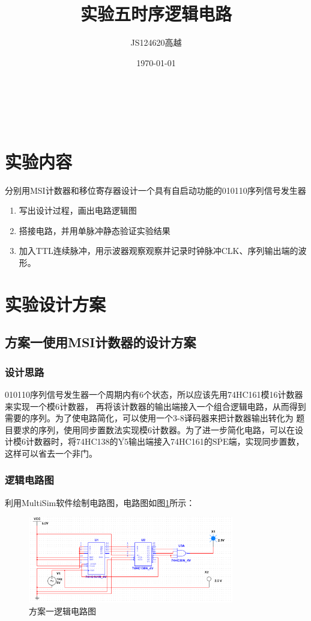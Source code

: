 \documentclass[zihao=-4]{ctexart} %
\title{实验五\quad 时序逻辑电路}
\author{JS124620\quad 高越}
\date{\today} %
\makeatletter
\renewcommand{\maketitle}{
    \begin{center}
        {\zihao{2}\CJKfontspec[FakeBold=3]{SimSun} \@title} \\[0.75em] %
        {\zihao{-4} \@author} \\[0.5em] %
        {\zihao{-4} \@date} %
    \end{center}
}
\makeatother
\begin{document}
\maketitle %

\section{实验内容} %
分别用MSI计数器和移位寄存器设计一个具有自启动功能的010110序列信号发生器
\begin{enumerate}
  \item 写出设计过程，画出电路逻辑图
  \item 搭接电路，并用单脉冲静态验证实验结果 
  \item 加入TTL连续脉冲，用示波器观察观察并记录时钟脉冲CLK、序列输出端的波形。
\end{enumerate}
\section{实验设计方案}
\subsection{方案一\quad 使用MSI计数器的设计方案}
\subsubsection{设计思路}
010110序列信号发生器一个周期内有6个状态，所以应该先用74HC161模16计数器来实现一个模6计数器，
再将该计数器的输出端接入一个组合逻辑电路，从而得到需要的序列。为了使电路简化，可以使用一个3-8译码器来把计数器输出转化为
题目要求的序列，使用同步置数法实现模6计数器。为了进一步简化电路，可以在设计模6计数器时，将74HC138的$\mathrm{\overline{Y5}}$输出端接入74HC161的$\mathrm{\overline{SPE}}$端，实现同步置数，这样可以省去一个非门。
\subsubsection{逻辑电路图}
利用MultiSim软件绘制电路图，电路图如图\ref{fig:161}所示：
\begin{figure}[htbp!]
    \centering
    \includegraphics[width=0.8\textwidth]{../img/Ex2_161.png} %
    \caption{方案一逻辑电路图}
    \label{fig:161}
  \end{figure}
\end{document}
